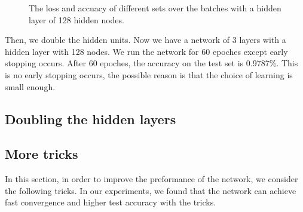 \documentclass{article} %
\begin{document}
\begin{figure} [!htbp]
	
	\caption{The loss and accuacy of different sets over the batches with a hidden layer of 128 hidden nodes. }  
	
\end{figure}
Then, we double the hidden units. Now we have a network of 3 layers with a hidden layer with 128 nodes. We run the network for 60 epoches except early stopping occurs. After 60 epoches, the accuracy on the test set is 0.9787\%. This is no early stopping occurs, the possible reason is that the choice of learning is small enough.



\subsection{Doubling the hidden layers}

\subsection{More tricks}
In this section, in order to improve the preformance of the network, we consider the following tricks. In our experiments, we found that the network can achieve fast convergence and higher test accuracy with the tricks.
\end{document}
